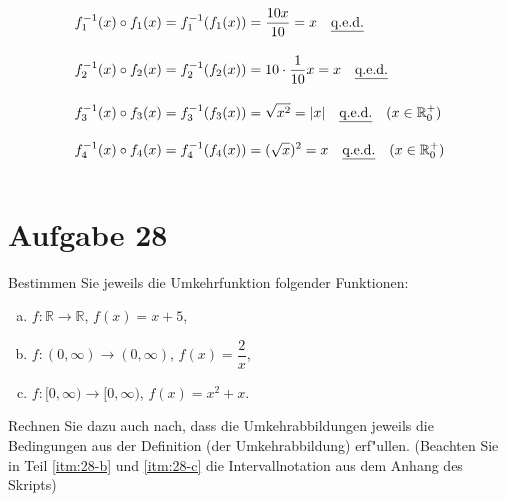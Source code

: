 \documentclass[10pt, oneside]{article}
\begin{document}
\begin{equation*}
    \begin{aligned}
        f_1^{-1}(x) \circ f_1(x) &= f_1^{-1}(f_1(x)) = \dfrac{10x}{10} = x \quad \text{\underline{q.e.d.}} \\[10pt]
        f_2^{-1}(x) \circ f_2(x) &= f_2^{-1}(f_2(x)) = 10 \cdot \dfrac{1}{10}x  = x \quad \text{\underline{q.e.d.}} \\[10pt]
        f_3^{-1}(x) \circ f_3(x) &= f_3^{-1}(f_3(x)) = \sqrt{x^2} = |x| \quad \text{\underline{q.e.d.}} \quad (x \in \mathbb{R}^{+}_0) \\[10pt]
        f_4^{-1}(x) \circ f_4(x) &= f_4^{-1}(f_4(x)) = (\sqrt{x})^2 = x \quad \text{\underline{q.e.d.}} \quad (x \in \mathbb{R}^{+}_0) \\[10pt]
    \end{aligned}
\end{equation*}

\section{Aufgabe 28}

Bestimmen Sie jeweils die Umkehrfunktion folgender Funktionen:
\begin{enumerate}[(a)]
    \item $f : \mathbb{R} \rightarrow \mathbb{R}$, $f(x) = x + 5$,
    \item \label{itm:28-b} $f : (0, \infty) \rightarrow (0, \infty)$, $f(x) = \dfrac{2}{x}$,
    \item \label{itm:28-c} $f : [0, \infty) \rightarrow [0, \infty)$, $f(x) = x^2 + x$.
\end{enumerate}
Rechnen Sie dazu auch nach, dass die Umkehrabbildungen jeweils die Bedingungen
aus der Definition (der Umkehrabbildung) erf"ullen. (Beachten Sie in Teil
\ref{itm:28-b} und \ref{itm:28-c} die Intervallnotation aus dem Anhang des Skripts)
\end{document}
